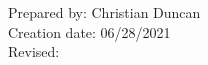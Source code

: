 \begin{enumerate}[1.]
\end{enumerate}

\noindent Prepared by: Christian Duncan\\
\noindent Creation date: 06/28/2021\\
\noindent Revised:\\
